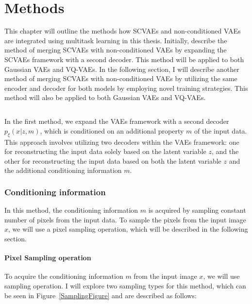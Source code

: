 \chapter{Methods}

This chapter will outline the methods how SCVAEs and non-conditioned VAEs are
integrated using multitask learning in this thesis. Initially, describe the
method of merging SCVAEs with non-conditioned VAEs by expanding the SCVAEs
framework with a second decoder. This method will be applied to both Gaussian
VAEs and VQ-VAEs. In the following section, I will describe another method of
merging SCVAEs with non-conditioned VAEs by utilizing the same encoder and
decoder for both models by employing novel training strategies. This method
will also be applied to both Gaussian VAEs and VQ-VAEs.


\section{}

In the first method, we expand the VAEs framework with a second decoder
$p_\xi(x|z,m)$, which is conditioned on an additional property $m$ of the input
data. This approach involves utilizing two decoders within the VAEs framework:
one for reconstructing the input data solely based on the latent variable $z$,
and the other for reconstructing the input data based on both the latent
variable $z$ and the additional conditioning information $m$.

\subsection{Conditioning information}

In this method, the conditioning information $m$ is acquired by sampling
constant number of pixels from the input data. To sample the pixels from the
input image $x$, we will use a pixel sampling operation, which will be
described in the following section.

\subsubsection{Pixel Sampling operation}

To acquire the conditioning information $m$ from the input image $x$, we will
use sampling operation. I will explore two sampling types for this method,
which can be seen in Figure~\ref{SamplingFigure} and are described as follows:

